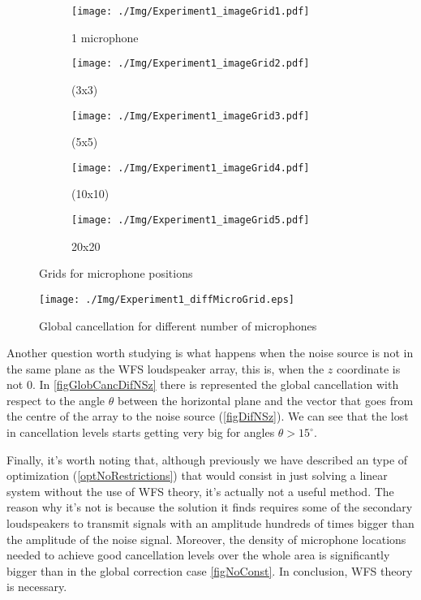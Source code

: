 \begin{figure}
	\centering
	\begin{subfigure}[b]{0.3\textwidth}
		\centering
		\texttt{[image: ./Img/Experiment1\_imageGrid1.pdf]}
		\caption{1 microphone}
	\end{subfigure}
	\begin{subfigure}[b]{0.3\textwidth}
		\centering
		\texttt{[image: ./Img/Experiment1\_imageGrid2.pdf]}
		\caption{(3x3)}
	\end{subfigure}
	\begin{subfigure}[b]{0.3\textwidth}
		\centering
		\texttt{[image: ./Img/Experiment1\_imageGrid3.pdf]}
		\caption{(5x5)}
	\end{subfigure}
	\begin{subfigure}[b]{0.3\textwidth}
		\centering
		\texttt{[image: ./Img/Experiment1\_imageGrid4.pdf]}
		\caption{(10x10)}
	\end{subfigure}
	\begin{subfigure}[b]{0.3\textwidth}
		\centering
		\texttt{[image: ./Img/Experiment1\_imageGrid5.pdf]}
		\caption{20x20}
	\end{subfigure}
	\caption{Grids for microphone positions}
	\label{figGrids}
\end{figure}

\begin{figure}
	\centering
	\texttt{[image: ./Img/Experiment1\_diffMicroGrid.eps]}
	\caption[Global cancellation for different number of microphones]{Global cancellation for different number of microphones}
	\label{figDiffMicroGridsCanc}
\end{figure}

Another question worth studying is what happens when the noise source is not in the same plane as the WFS loudspeaker array, this is, when the $z$ coordinate is not 0. In \autoref{figGlobCancDifNSz} there is represented the global cancellation with respect to the angle $\theta$ between the horizontal plane and the vector that goes from the centre of the array to the noise source (\autoref{figDifNSz}). We can see that the lost in cancellation levels starts getting very big for angles $\theta > 15^\circ$.

Finally, it's worth noting that, although previously we have described an type of optimization (\autoref{optNoRestrictions}) that would consist in just solving a linear system without the use of WFS theory, it's actually not a useful method. The reason why it's not is because the solution it finds requires some of the secondary loudspeakers to transmit signals with an amplitude hundreds of times bigger than the amplitude of the noise signal. Moreover, the density of microphone locations needed to achieve good cancellation levels over the whole area is significantly bigger than in the global correction case \autoref{figNoConst}. In conclusion, WFS theory is necessary.

